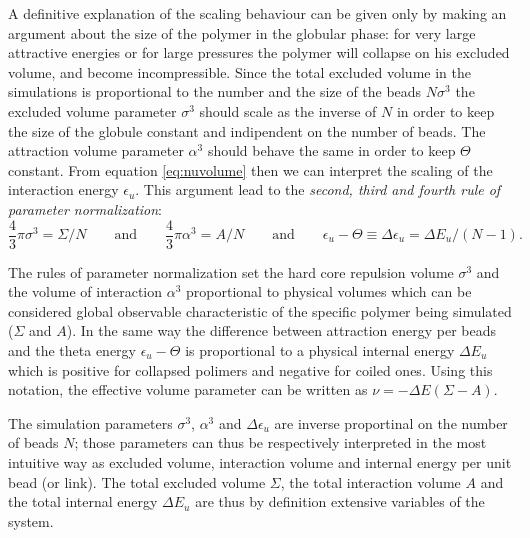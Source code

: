 \documentclass[12pt,a4paper,notitlepage]{article}
\begin{document}
A definitive explanation of the scaling behaviour can be given only by
making an argument about the size of the polymer in the globular
phase: for very large attractive energies or for large pressures the
polymer will collapse on his excluded volume, and become
incompressible. Since the total excluded volume in the simulations is
proportional to the number and the size of the beads
$N \sigma^3$ the excluded volume parameter $\sigma^3$ should scale as
the inverse of $N$ in order to keep the size of the globule constant
and indipendent on the number of beads. The attraction volume
parameter $\alpha^3$ should behave the same in order to keep $\Theta$
constant. From equation \ref{eq:nuvolume} then we can interpret the
scaling of the interaction energy $\epsilon_u$.
This argument lead to the {\it second, third and fourth rule of
  parameter normalization}:
\begin{equation}
   \frac{4}{3} \pi \sigma^3 =  \Sigma / N \qquad \mathrm{and} \qquad 
   \frac{4}{3} \pi \alpha^3 =  A / N \qquad \mathrm{and} \qquad 
   \epsilon_u - \Theta \equiv \Delta  \epsilon_u = 
  \Delta E_u / (N - 1).
\label{eq:sigmarin}
\end{equation}

The rules of parameter normalization set the hard core repulsion
volume $\sigma^3$ and the volume of interaction $\alpha^3$
proportional to physical volumes which can be considered global
observable characteristic of the specific polymer being simulated
($\Sigma$ and $A$). In the same way the difference between attraction
energy per beads and the theta energy $\epsilon_u - \Theta$ is
proportional to a physical internal energy $\Delta E_u$ which is
positive for collapsed polimers and negative for coiled ones. Using
this notation, the effective volume parameter can be written as
$\nu = - \Delta E \left( \Sigma - A \right)$.

The simulation parameters $\sigma^3$, $\alpha^3$ and $\Delta
\epsilon_u$ are inverse proportinal on the number of beads
$N$; those parameters can thus be respectively interpreted in the most
intuitive way as excluded volume, interaction volume and internal
energy per unit bead (or link). The total excluded volume $\Sigma$,
the total interaction volume $A$ and the total internal energy $\Delta
E_u$ are thus by definition extensive variables of the system.
\end{document}
